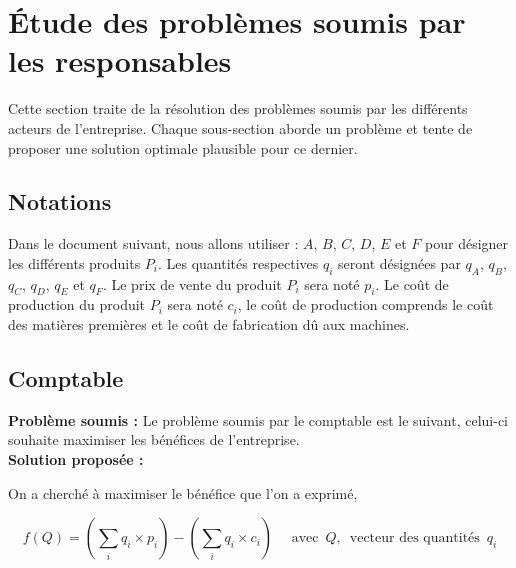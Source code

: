 \documentclass[paper=a4, fontsize=11pt]{scrartcl}
\numberwithin{equation}{section}		%
\numberwithin{figure}{section}			%
\numberwithin{table}{section}				%
\renewcommand{\bf}[1]{\textbf{#1}}
\begin{document}


\tableofcontents
\listoftodos

\newpage

\section{\'Etude des problèmes soumis par les responsables}
Cette section traite de la résolution des problèmes soumis par les différents acteurs de l'entreprise. Chaque sous-section aborde un problème et tente de proposer une solution optimale plausible pour ce dernier.

\subsection*{Notations}

Dans le document suivant, nous allons utiliser : 
$A$, $B$, $C$, $D$, $E$ et $F$ pour désigner les différents produits $P_i$. Les quantités respectives $q_i$ seront désignées par $q_A$, $q_B$, $q_C$, $q_D$, $q_E$ et $q_F$. Le prix de vente du produit $P_i$ sera noté $p_i$. Le coût de production du produit $P_i$ sera noté $c_i$, le coût de production comprends le coût des matières premières et le coût de fabrication dû aux machines.

\subsection{Comptable}
\bf{Problème soumis :}
Le problème soumis par le comptable est le suivant, celui-ci souhaite maximiser les bénéfices de l'entreprise.\\

\bf{Solution proposée :}

On a cherché à maximiser le bénéfice que l'on a exprimé, 

\[f(Q) = (\sum_i q_i \times p_i ) - (\sum_i q_i \times c_i) \quad \text{  avec } \, Q, \, \text{ vecteur des quantités } \, q_i \]
\end{document}
